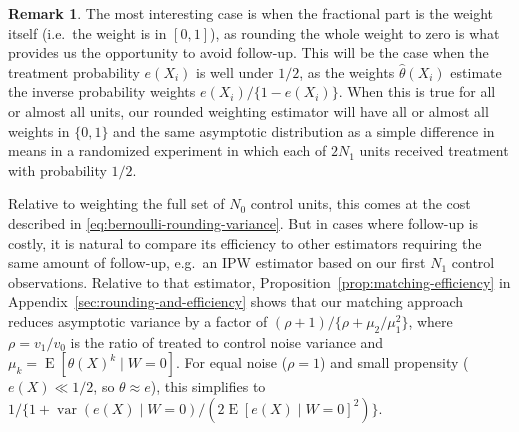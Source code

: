 \documentclass{article}
\theoremstyle{definition}
\newtheorem{proposition}[theorem]{Proposition}
\newtheorem{remark}{Remark}
\DeclareMathOperator{\E}{E}
\DeclareMathOperator{\Var}{var}
\DeclarePairedDelimiter\floor{\lfloor}{\rfloor}
\newcommand{\model}{\mathcal{M}}
\newcommand{\<}{\langle}
\renewcommand{\>}{\rangle}
\begin{document}
\begin{remark}
\label{rem:matching-variance}
The most interesting case is when the fractional part is the weight itself (i.e.\ the weight is in $[0,1]$), as rounding the whole weight to zero is what provides us the opportunity to avoid follow-up. This will be the case when the treatment probability $e(X_i)$ is well under $1/2$, as the weights $\hat\theta(X_i)$ estimate the inverse probability weights $e(X_i)/\{1-e(X_i)\}$. When this is true for all or almost all units, our rounded weighting estimator will have all or almost all weights in $\{0,1\}$ and the same asymptotic distribution as a simple difference in means in a randomized experiment in which each of $2N_1$ units received treatment with probability $1/2$.

Relative to weighting the full set of $N_0$ control units, this comes at the cost described in \eqref{eq:bernoulli-rounding-variance}. But in cases where follow-up is costly, it is natural to compare its efficiency to other estimators requiring the same amount of follow-up, e.g.\ an IPW estimator based on our first $N_1$ control observations. Relative to that estimator, Proposition~\ref{prop:matching-efficiency} in Appendix~\ref{sec:rounding-and-efficiency} shows that our matching approach reduces asymptotic variance by a factor of $(\rho+1)/\{\rho + \mu_2/\mu_1^2\}$, where $\rho = v_1/v_0$ is the ratio of treated to control noise variance and $\mu_k = \E[\theta(X)^k \mid W=0]$. For equal noise ($\rho=1$) and small propensity ($e(X) \ll 1/2$, so $\theta \approx e$), this simplifies to $1/\{1+\Var(e(X)\mid W=0)/(2\E[e(X)\mid W=0]^2)\}$.
\end{remark}

\end{document}

